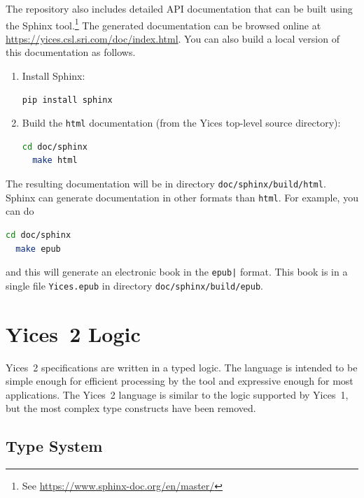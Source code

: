 \documentclass[11pt,twoside,fleqn,openright,titlepage]{cslreport}
\begin{document}
\medskip\noindent The repository also includes detailed API
documentation that can be built using the Sphinx tool.\footnote{See
  \url{https://www.sphinx-doc.org/en/master/}} The generated
documentation can be browsed online at
\url{https://yices.csl.sri.com/doc/index.html}. You can also build a local version of
this documentation as follows.
\begin{enumerate}
\item Install Sphinx:
\begin{small}
\begin{lstlisting}[language=sh]
  pip install sphinx
\end{lstlisting}
\end{small}
\item Build the \texttt{html} documentation (from the Yices top-level source directory):
\begin{small}
\begin{lstlisting}[language=sh,deletekeywords={cd}]
  cd doc/sphinx
  make html
\end{lstlisting}
\end{small}
\end{enumerate}
The resulting documentation will be in directory
\texttt{doc/sphinx/build/html}. Sphinx can generate documentation in
other formats than \texttt{html}. For example, you can do
\begin{small}
\begin{lstlisting}[language=sh,deletekeywords={cd}]
  cd doc/sphinx
  make epub
\end{lstlisting}
\end{small}
and this will generate an electronic book in the \texttt{epub|} format. This book is in
a single file \texttt{Yices.epub} in directory \texttt{doc/sphinx/build/epub}.


\chapter{Yices~2 Logic}
\label{language}

Yices~2 specifications are  written in a typed logic.  The language is
intended to be simple enough  for efficient processing by the tool and
expressive  enough  for most  applications.  The  Yices~2 language  is
similar to the  logic supported by Yices~1, but  the most complex type
constructs have been removed.


\section{Type System}
\label{type-system}
\end{document}
